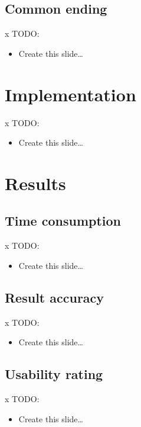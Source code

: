 \documentclass{beamer}
\begin{document}
\subsection{Common ending}
\begin{frame}{x}{}
TODO:
\begin{itemize}
\item Create this slide\ldots
\end{itemize}
\end{frame}



\section{Implementation}
\begin{frame}{x}{}
TODO:
\begin{itemize}
\item Create this slide\ldots
\end{itemize}
\end{frame}



\section{Results}
\subsection{Time consumption}
\begin{frame}{x}{}
TODO:
\begin{itemize}
\item Create this slide\ldots
\end{itemize}
\end{frame}


\subsection{Result accuracy}
\begin{frame}{x}{}
TODO:
\begin{itemize}
\item Create this slide\ldots
\end{itemize}
\end{frame}


\subsection{Usability rating}
\begin{frame}{x}{}
TODO:
\begin{itemize}
\item Create this slide\ldots
\end{itemize}
\end{frame}
\end{document}

